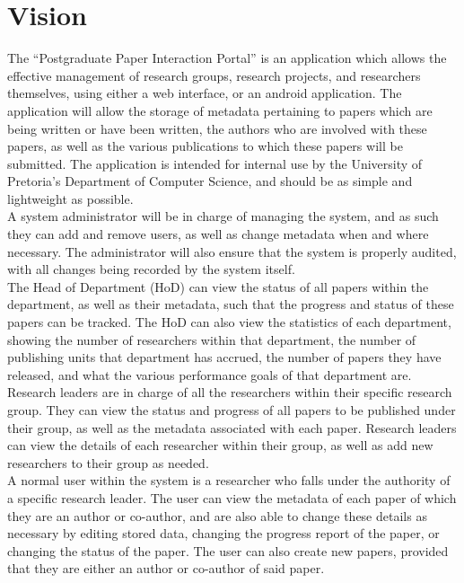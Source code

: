 \documentclass{article}
\begin{document}
\section{Vision}
The “Postgraduate Paper Interaction Portal” is an application which allows the effective management of research groups, research projects, and researchers themselves, using either a web interface, or an android application. The application will allow the storage of metadata pertaining to papers which are being written or have been written, the authors who are involved with these papers, as well as the various publications to which these papers will be submitted. The application is intended for internal use by the University of Pretoria’s Department of Computer Science, and should be as simple and lightweight as possible.\\


A system administrator will be in charge of managing the system, and as such they can add and remove users, as well as change metadata when and where necessary. The administrator will also ensure that the system is properly audited, with all changes being recorded by the system itself.\\


The Head of Department (HoD) can view the status of all papers within the department, as well as their metadata, such that the progress and status of these papers can be tracked. The HoD can also view the statistics of each department, showing the number of researchers within that department, the number of publishing units that department has accrued, the number of papers they have released, and what the various performance goals of that department are.\\



Research leaders are in charge of all the researchers within their specific research group. They can view the status and progress of all papers to be published under their group, as well as the metadata associated with each paper. Research leaders can view the details of each researcher within their group, as well as add new researchers to their group as needed.\\


A normal user within the system is a researcher who falls under the authority of a specific research leader. The user can view the metadata of each paper of which they are an author or co-author, and are also able to change these details as necessary by editing stored data, changing the progress report of the paper, or changing the status of the paper. The user can also create new papers, provided that they are either an author or co-author of said paper.\\
\end{document}
